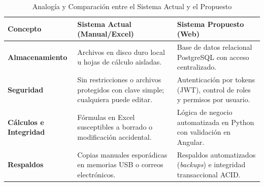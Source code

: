 \begin{table}[htbp]
    \centering
    \caption{Analogía y Comparación entre el Sistema Actual y el Propuesto}
    \label{tab:comparativa_sistema}
    \vspace{0.2cm}
    \begin{tabular}{p{3cm} p{5.5cm} p{6.5cm}}
        \toprule
        \textbf{Concepto} & \textbf{Sistema Actual (Manual/Excel)} & \textbf{Sistema Propuesto (Web)} \\
        \midrule
        \textbf{Almacenamiento} & Archivos en disco duro local u hojas de cálculo aisladas. & Base de datos relacional PostgreSQL con acceso centralizado. \\
        \addlinespace
        \textbf{Seguridad} & Sin restricciones o archivos protegidos con clave simple; cualquiera puede editar. & Autenticación por tokens (JWT), control de roles y permisos por usuario. \\
        \addlinespace
        \textbf{Cálculos e Integridad} & Fórmulas en Excel susceptibles a borrado o modificación accidental. & Lógica de negocio automatizada en Python con validación en Angular. \\
        \addlinespace
        \textbf{Respaldos} & Copias manuales esporádicas en memorias USB o correos electrónicos. & Respaldos automatizados (\textit{backups}) e integridad transaccional ACID. \\
        \bottomrule
    \end{tabular}
\end{table}
